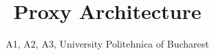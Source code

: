 \documentclass[letterpaper]{sig-alternate-10pt}
\begin{document}
\title{Proxy Architecture}
\author{A1, A2, A3, University Politehnica of Bucharest}

\maketitle

\begin{abstract}

\end{abstract}






%




\scriptsize

%

\end{document}
